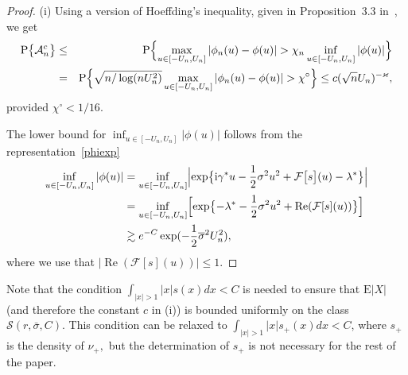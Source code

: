 \documentclass[a4paper,11pt]{article}
\theoremstyle{definition}
\newcommand{\1}{\mathbb{I}}
\newcommand{\E}{{\mathrm E}}
\renewcommand{\i}{\mathrm{i}}
\renewcommand{\Re}{\operatorname{Re}}
\renewcommand{\P}{{\mathrm P}}
\renewcommand{\kappa}{\varkappa}
\newcommand{\F}{\mathcal{F}}
\theoremstyle{remark}
\begin{document}
\begin{proof}
(i) Using a version of Hoeffding's inequality, given in Proposition~3.3 in~\cite{BR2015}, we get 
     \begin{eqnarray*}
         \P\bigl\{\mathcal{A}_n^c \bigr\}&\leq& \P\Bigl\{\max_{u \in [-U_n,U_n]}|\phi_n(u) - \phi(u)| > \chi_n \inf_{u \in [-U_n, U_n]}|\phi(u)|\Bigr\} \\
    &=& \P\Bigl\{ \sqrt{n/\log(nU_n^2)}\max_{u \in [-U_n,U_n]} |\phi_n(u) - \phi(u)| > \chi^\circ \Bigr\}
    \leq c (\sqrt{n}U_n)^{-\kappa},
     \end{eqnarray*}
provided \(\chi^\circ<1/16\).

\item[(ii)] The lower bound for $\inf_{u \in [-U_n, U_n]}|\phi(u)|$ follows from the representation~\eqref{phiexp}
\begin{align*}
    \inf_{u \in [-U_n, U_n]}|\phi(u)| &=  \inf_{u \in [-U_n, U_n]}\Bigl|
    \exp\bigl\{
      \i \gamma^* u-\frac{1}{2}\sigma^2 u^2			    +
\F\bigl[s \bigr](u) -  \lambda^*\bigr\}
\Bigr| \\
    &= \inf_{u \in [-U_n, U_n]}\Bigl[\exp\bigl\{-\lambda^*-\frac{1}{2}\sigma^2u^2 + \Re(\F[s](u))\bigr\}\Bigr]\\
    &\gtrsim e^{-C}\exp(-\frac{1}{2}\overline{\sigma}^2U_n^2),
\end{align*}
where we use that $|\Re(\F[s](u))| \leq 1$.
\end{proof}

Note that the condition \(\int_{|x|>1 }|x| s(x)dx < C\)  is needed to ensure that $\E |X|$ (and therefore the constant \(c\) in (i)) is bounded uniformly on the class $\mathcal{S}(r, \bar{\sigma}, C)$. This condition can be relaxed to \(\int_{|x|>1 }|x| s_+(x)dx < C\), where \(s_+\) is the density of \(\nu_+,\) but the determination of \(s_+\) is not necessary for the rest of the paper.
\end{document}
